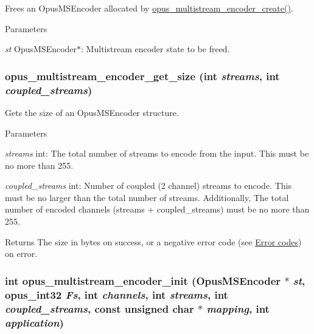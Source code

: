 Frees an {\ttfamily OpusMSEncoder} allocated by \hyperlink{group__opus__multistream_gaeb64c648ed8155f824ca8d9a93ccecae}{opus\_\-multistream\_\-encoder\_\-create()}. 
\begin{DoxyParams}{Parameters}
\item[{\em st}]{\ttfamily OpusMSEncoder$\ast$}: Multistream encoder state to be freed. \end{DoxyParams}
\hypertarget{group__opus__multistream_ga8642aa9cf16115229a655574d832293b}{
\subsubsection[{opus\_\-multistream\_\-encoder\_\-get\_\-size}]{ opus\_\-multistream\_\-encoder\_\-get\_\-size (int {\em streams}, \/  int {\em coupled\_\-streams})}}
\label{group__opus__multistream_ga8642aa9cf16115229a655574d832293b}


Gets the size of an OpusMSEncoder structure. 
\begin{DoxyParams}{Parameters}
\item[{\em streams}]{\ttfamily int}: The total number of streams to encode from the input. This must be no more than 255. \item[{\em coupled\_\-streams}]{\ttfamily int}: Number of coupled (2 channel) streams to encode. This must be no larger than the total number of streams. Additionally, The total number of encoded channels ({\ttfamily streams + coupled\_\-streams}) must be no more than 255. \end{DoxyParams}
\begin{DoxyReturn}{Returns}
The size in bytes on success, or a negative error code (see \hyperlink{group__opus__errorcodes}{Error codes}) on error. 
\end{DoxyReturn}
\hypertarget{group__opus__multistream_gae7586aa54c322fd9599de24b5c8b8c01}{
\subsubsection[{opus\_\-multistream\_\-encoder\_\-init}]{\setlength{\rightskip}{0pt plus 5cm}int opus\_\-multistream\_\-encoder\_\-init ({\bf OpusMSEncoder} $\ast$ {\em st}, \/  {\bf opus\_\-int32} {\em Fs}, \/  int {\em channels}, \/  int {\em streams}, \/  int {\em coupled\_\-streams}, \/  const unsigned char $\ast$ {\em mapping}, \/  int {\em application})}}
\label{group__opus__multistream_gae7586aa54c322fd9599de24b5c8b8c01}


